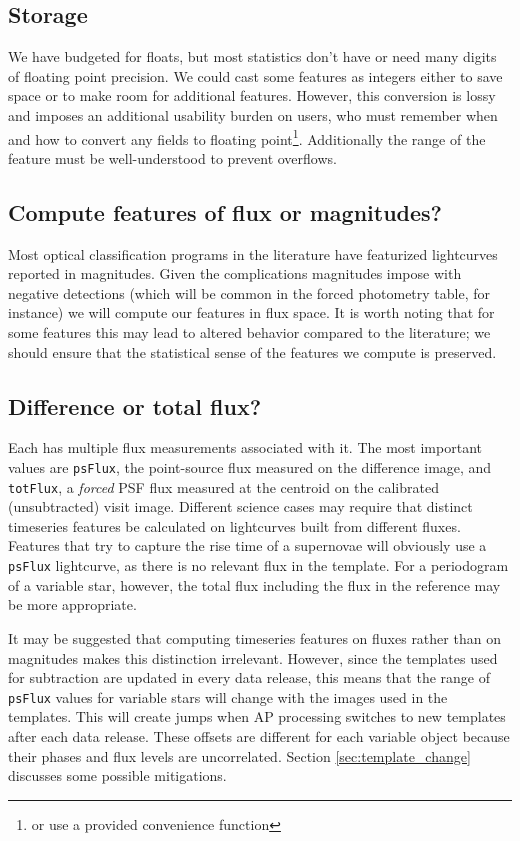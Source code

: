 \documentclass[DM,authoryear,toc]{lsstdoc}
\begin{document}
\subsection{Storage}

We have budgeted for floats, but most statistics don't have or need many digits of floating point precision.
We could cast some features as integers either to save space or to make room for additional features.
However, this conversion is lossy and imposes an additional usability burden on users, who must remember when and how to convert any fields to floating point\footnote{or use a provided convenience function}.
Additionally the range of the feature must be well-understood to prevent overflows.

\subsection{Compute features of flux or magnitudes?}

Most optical classification programs in the literature have featurized lightcurves reported in magnitudes.
Given the complications magnitudes impose with negative detections (which will be common in the forced photometry table, for instance) we will compute our features in flux space.
It is worth noting that for some features this may lead to altered behavior compared to the literature; we should ensure that the statistical sense of the features we compute is preserved. 

\subsection{Difference or total flux?} \label{sec:totFlux}

Each \DIASource has multiple flux measurements associated with it.  
The most important values are \texttt{psFlux}, the point-source flux measured on the difference image, and \texttt{totFlux}, a \textit{forced} PSF flux measured at the \DIASource centroid on the calibrated (unsubtracted) visit image.
Different science cases may require that distinct timeseries features be calculated on lightcurves built from different fluxes.
Features that try to capture the rise time of a supernovae will obviously use a \texttt{psFlux} lightcurve, as there is no relevant flux in the template.
For a periodogram of a variable star, however, the total flux including the flux in the reference may be more appropriate.

It may be suggested that computing timeseries features on fluxes rather than on magnitudes makes this distinction irrelevant.  
However, since the templates used for subtraction are updated in every data release, this means that the range of \texttt{psFlux} values for variable stars will change with the images used in the templates.  
This will create jumps when AP processing switches to new templates after each data release.
These offsets are different for each variable object because their phases and flux levels are uncorrelated.
Section \ref{sec:template_change} discusses some possible mitigations.
\end{document}
